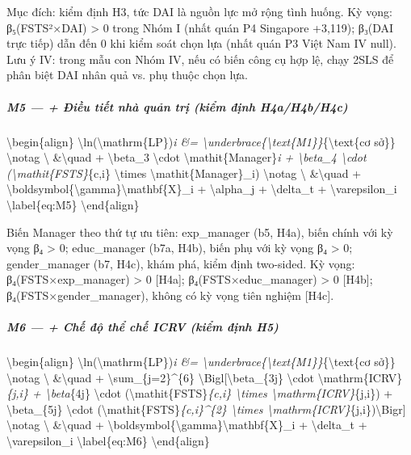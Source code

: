 \documentclass[12pt,a4paper]{article}
\begin{document}
Mục đích: kiểm định H3, tức DAI là nguồn lực mở rộng tình huống. Kỳ
vọng: β₅(FSTS²×DAI) \textgreater{} 0 trong Nhóm I (nhất quán P4
Singapore +3,119); β₃(DAI trực tiếp) dẫn đến 0 khi kiểm soát chọn lựa
(nhất quán P3 Việt Nam IV null). Lưu ý IV: trong mẫu con Nhóm IV, nếu có
biến công cụ hợp lệ, chạy 2SLS để phân biệt DAI nhân quả vs. phụ thuộc
chọn lựa.

\hypertarget{m5---ux111iux1ec1u-tiux1ebft-nhuxe0-quux1ea3n-trux1ecb-kiux1ec3m-ux111ux1ecbnh-h4ah4bh4c}{%
\subparagraph{M5 --- + Điều tiết nhà quản trị (kiểm định
H4a/H4b/H4c)}\label{m5---ux111iux1ec1u-tiux1ebft-nhuxe0-quux1ea3n-trux1ecb-kiux1ec3m-ux111ux1ecbnh-h4ah4bh4c}}

\textbackslash begin\{align\}
\textbackslash ln(\textbackslash mathrm\{LP\})\emph{i \&=
\textbackslash underbrace\{\textbackslash text\{M1\}\}}\{\textbackslash text\{cơ
sở\}\} \textbackslash notag \textbackslash{} \&\textbackslash quad +
\textbackslash beta\_3 \textbackslash cdot
\textbackslash mathit\{Manager\}\emph{i + \textbackslash beta\_4
\textbackslash cdot (\textbackslash mathit\{FSTS\}}\{c,i\}
\textbackslash times \textbackslash mathit\{Manager\}\_i)
\textbackslash notag \textbackslash{} \&\textbackslash quad +
\textbackslash boldsymbol\{\textbackslash gamma\}\textquotesingle\textbackslash mathbf\{X\}\_i
+ \textbackslash alpha\_j + \textbackslash delta\_t +
\textbackslash varepsilon\_i \textbackslash label\{eq:M5\}
\textbackslash end\{align\}

Biến Manager theo thứ tự ưu tiên: exp\_manager (b5, H4a), biến chính với
kỳ vọng β₄ \textgreater{} 0; educ\_manager (b7a, H4b), biến phụ với kỳ
vọng β₄ \textgreater{} 0; gender\_manager (b7, H4c), khám phá, kiểm định
two-sided. Kỳ vọng: β₄(FSTS×exp\_manager) \textgreater{} 0 {[}H4a{]};
β₄(FSTS×educ\_manager) \textgreater{} 0 {[}H4b{]};
β₄(FSTS×gender\_manager), không có kỳ vọng tiên nghiệm {[}H4c{]}.

\hypertarget{m6---chux1ebf-ux111ux1ed9-thux1ec3-chux1ebf-icrv-kiux1ec3m-ux111ux1ecbnh-h5}{%
\subparagraph{M6 --- + Chế độ thể chế ICRV (kiểm định
H5)}\label{m6---chux1ebf-ux111ux1ed9-thux1ec3-chux1ebf-icrv-kiux1ec3m-ux111ux1ecbnh-h5}}

\textbackslash begin\{align\}
\textbackslash ln(\textbackslash mathrm\{LP\})\emph{i \&=
\textbackslash underbrace\{\textbackslash text\{M1\}\}}\{\textbackslash text\{cơ
sở\}\} \textbackslash notag \textbackslash{} \&\textbackslash quad +
\textbackslash sum\_\{j=2\}\^{}\{6\}
\textbackslash Bigl{[}\textbackslash beta\_\{3j\} \textbackslash cdot
\textbackslash mathrm\{ICRV\}\emph{\{j,i\} + \textbackslash beta}\{4j\}
\textbackslash cdot (\textbackslash mathit\{FSTS\}\emph{\{c,i\}
\textbackslash times \textbackslash mathrm\{ICRV\}}\{j,i\}) +
\textbackslash beta\_\{5j\} \textbackslash cdot
(\textbackslash mathit\{FSTS\}\emph{\{c,i\}\^{}\{2\}
\textbackslash times
\textbackslash mathrm\{ICRV\}}\{j,i\})\textbackslash Bigr{]}
\textbackslash notag \textbackslash{} \&\textbackslash quad +
\textbackslash boldsymbol\{\textbackslash gamma\}\textquotesingle\textbackslash mathbf\{X\}\_i
+ \textbackslash delta\_t + \textbackslash varepsilon\_i
\textbackslash label\{eq:M6\} \textbackslash end\{align\}
\end{document}
